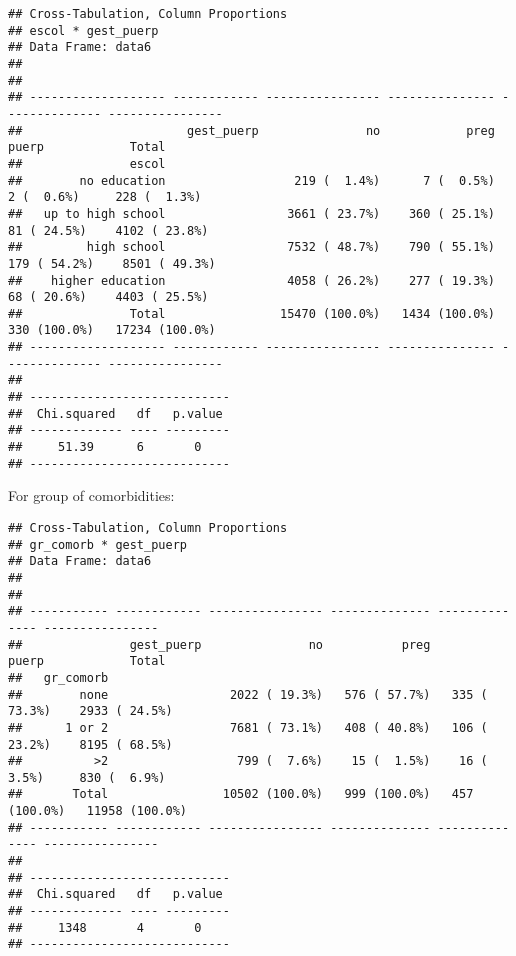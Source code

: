 \documentclass[
]{article}
\newenvironment{Shaded}{\begin{snugshade}}{\end{snugshade}}
\newcommand{\DataTypeTok}[1]{\textcolor[rgb]{0.13,0.29,0.53}{#1}}
\newcommand{\KeywordTok}[1]{\textcolor[rgb]{0.13,0.29,0.53}{\textbf{#1}}}
\newcommand{\NormalTok}[1]{#1}
\newcommand{\OperatorTok}[1]{\textcolor[rgb]{0.81,0.36,0.00}{\textbf{#1}}}
\newcommand{\OtherTok}[1]{\textcolor[rgb]{0.56,0.35,0.01}{#1}}
\newcommand{\StringTok}[1]{\textcolor[rgb]{0.31,0.60,0.02}{#1}}
\begin{document}
\begin{verbatim}
## Cross-Tabulation, Column Proportions  
## escol * gest_puerp  
## Data Frame: data6  
## 
## 
## ------------------- ------------ ---------------- --------------- -------------- ----------------
##                       gest_puerp               no            preg          puerp            Total
##               escol                                                                              
##        no education                  219 (  1.4%)      7 (  0.5%)     2 (  0.6%)     228 (  1.3%)
##   up to high school                 3661 ( 23.7%)    360 ( 25.1%)    81 ( 24.5%)    4102 ( 23.8%)
##         high school                 7532 ( 48.7%)    790 ( 55.1%)   179 ( 54.2%)    8501 ( 49.3%)
##    higher education                 4058 ( 26.2%)    277 ( 19.3%)    68 ( 20.6%)    4403 ( 25.5%)
##               Total                15470 (100.0%)   1434 (100.0%)   330 (100.0%)   17234 (100.0%)
## ------------------- ------------ ---------------- --------------- -------------- ----------------
## 
## ----------------------------
##  Chi.squared   df   p.value 
## ------------- ---- ---------
##     51.39      6       0    
## ----------------------------
\end{verbatim}

For group of comorbidities:

\begin{Shaded}
\end{Shaded}

\begin{verbatim}
## Cross-Tabulation, Column Proportions  
## gr_comorb * gest_puerp  
## Data Frame: data6  
## 
## 
## ----------- ------------ ---------------- -------------- -------------- ----------------
##               gest_puerp               no           preg          puerp            Total
##   gr_comorb                                                                             
##        none                 2022 ( 19.3%)   576 ( 57.7%)   335 ( 73.3%)    2933 ( 24.5%)
##      1 or 2                 7681 ( 73.1%)   408 ( 40.8%)   106 ( 23.2%)    8195 ( 68.5%)
##          >2                  799 (  7.6%)    15 (  1.5%)    16 (  3.5%)     830 (  6.9%)
##       Total                10502 (100.0%)   999 (100.0%)   457 (100.0%)   11958 (100.0%)
## ----------- ------------ ---------------- -------------- -------------- ----------------
## 
## ----------------------------
##  Chi.squared   df   p.value 
## ------------- ---- ---------
##     1348       4       0    
## ----------------------------
\end{verbatim}
\end{document}
